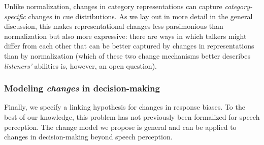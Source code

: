 \documentclass[
  11pt,
  man,floatsintext]{apa6}
\begin{document}
Unlike normalization, changes in category representations can capture \emph{category-specific} changes in cue distributions. As we lay out in more detail in the general discussion, this makes representational changes less parsimonious than normalization but also more expressive: there are ways in which talkers might differ from each other that can be better captured by changes in representations than by normalization (which of these two change mechanisms better describes \emph{listeners'} abilities is, however, an open question).

\hypertarget{sec:change-bias}{%
\subsubsection{\texorpdfstring{Modeling \emph{changes} in decision-making}{Modeling changes in decision-making}}\label{sec:change-bias}}

Finally, we specify a linking hypothesis for changes in response biases. To the best of our knowledge, this problem has not previously been formalized for speech perception. The change model we propose is general and can be applied to changes in decision-making beyond speech perception.
\end{document}
